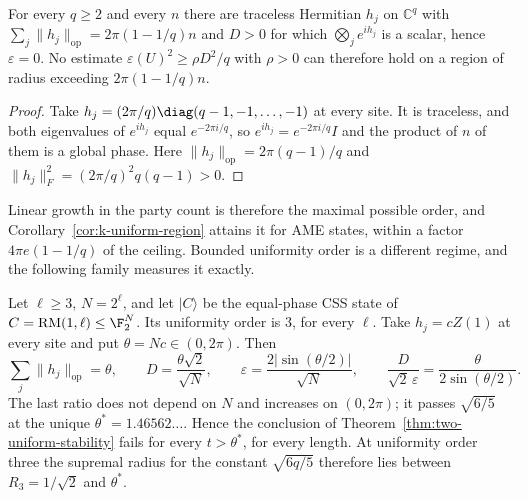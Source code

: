 \begin{proposition}
\label{prop:region-ceiling}
For every \(q\geq2\) and every \(n\) there are traceless Hermitian \(h_j\)
on \(\mathbb C^q\) with
\(\sum_j\lVert h_j\rVert_{\mathrm{op}}=2\pi(1-1/q)n\) and \(D>0\) for which
\(\bigotimes_je^{ih_j}\) is a scalar, hence \(\varepsilon=0\).  No estimate
\(\varepsilon(U)^2\geq\rho D^2/q\) with \(\rho>0\) can therefore hold on a
region of radius exceeding \(2\pi(1-1/q)n\).
\end{proposition}

\begin{proof}
Take \(h_j=(2\pi/q)\diag(q-1,-1,\ldots,-1)\) at every site.  It is
traceless, and both eigenvalues of \(e^{ih_j}\) equal \(e^{-2\pi i/q}\), so
\(e^{ih_j}=e^{-2\pi i/q}I\) and the product of \(n\) of them is a global
phase.  Here \(\lVert h_j\rVert_{\mathrm{op}}=2\pi(q-1)/q\) and
\(\lVert h_j\rVert_F^2=(2\pi/q)^2q(q-1)>0\).
\end{proof}

Linear growth in the party count is therefore the maximal possible order,
and Corollary~\ref{cor:k-uniform-region} attains it for AME states, within
a factor \(4\pi e(1-1/q)\) of the ceiling.  Bounded uniformity order is a
different regime, and the following family measures it exactly.

\begin{proposition}
\label{prop:stability-region}
Let \(\ell\geq3\), \(N=2^\ell\), and let \(\lvert C\rangle\) be the
equal-phase CSS state of \(C=\mathrm{RM}(1,\ell)\leq\F_2^N\).  Its
uniformity order is \(3\), for every \(\ell\).  Take
\(h_j=cZ(1)\) at every site and put \(\theta=Nc\in(0,2\pi)\).  Then
\[
 \sum_j\lVert h_j\rVert_{\mathrm{op}}=\theta,\qquad
 D=\frac{\theta\sqrt2}{\sqrt N},\qquad
 \varepsilon=\frac{2\lvert\sin(\theta/2)\rvert}{\sqrt N},\qquad
 \frac D{\sqrt2\,\varepsilon}=\frac\theta{2\sin(\theta/2)} .
\]
The last ratio does not depend on \(N\) and increases on \((0,2\pi)\); it
passes \(\sqrt{6/5}\) at the unique \(\theta^*=1.46562\ldots\).  Hence the
conclusion of Theorem~\ref{thm:two-uniform-stability} fails for every
\(t>\theta^*\), for every length.  At uniformity order three the supremal
radius for the constant \(\sqrt{6q/5}\) therefore lies between
\(R_3=1/\sqrt2\) and \(\theta^*\).
\end{proposition}

